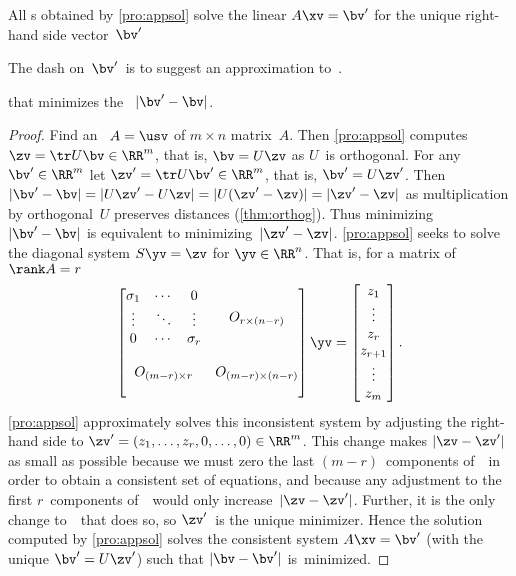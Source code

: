 \begin{theorem} \label{thm:appsol} 
All s obtained by \autoref{pro:appsol} solve the linear  \(A\xv=\bv'\) for the unique  right-hand side vector~\(\bv'\) 
\begin{aside} The dash on~\(\bv'\)\ is to suggest an approximation to~\bv. \end{aside}%
that minimizes the ~\(|\bv'-\bv|\).
\end{theorem}
\begin{proof} 
Find an \svd\ \(A=\usv\) of \(m\times n\) matrix~\(A\).
Then \autoref{pro:appsol} computes \(\zv=\tr U\bv\in\RR^m\), that is, \(\bv=U\zv\) as \(U\)~is orthogonal.
For any \(\bv'\in\RR^m\) let \(\zv'=\tr U\bv'\in\RR^m\), that is, \(\bv'=U\zv'\).
Then \(|\bv'-\bv|=|U\zv'-U\zv|=|U(\zv'-\zv)|=|\zv'-\zv|\) as multiplication by orthogonal~\(U\) preserves distances (\autoref{thm:orthog}).
Thus minimizing~\(|\bv'-\bv|\) is equivalent to minimizing~\(|\zv'-\zv|\).
\autoref{pro:appsol} seeks to solve the diagonal system \(S\yv=\zv\) for \(\yv\in\RR^n\). 
That is, for a matrix of \(\rank A=r\)
\begin{equation*}
\begin{bmatrix} \begin{matrix} \sigma_1&\cdots&0\\
\vdots&\ddots&\vdots\\
0&\cdots&\sigma_r \end{matrix} & 
O_{r\times (n-r)}\\\,\\
O_{(m-r)\times r}&O_{(m-r)\times (n-r)}
\\\,\end{bmatrix}\yv
=\begin{bmatrix} z_1\\\vdots\\z_r\\z_{r+1}\\\vdots\\z_m \end{bmatrix}.
\end{equation*}
\autoref{pro:appsol} approximately solves this inconsistent system by adjusting the right-hand side to \(\zv'=(z_1,\ldots,z_r,0,\ldots,0)\in\RR^m\).
This change makes \(|\zv-\zv'|\) as small as possible because we must zero the last \((m-r)\)~components of~\zv\ in order to obtain a consistent set of equations, and because any adjustment to the first \(r\)~components of~\zv\ would only increase~\(|\zv-\zv'|\).
Further, it is the only change to~\zv\ that does so, so \(\zv'\)~is the unique minimizer.
Hence the solution computed by \autoref{pro:appsol} solves the consistent system \(A\xv=\bv'\) (with the unique \(\bv'=U\zv'\)) such that \(|\bv-\bv'|\) is~minimized.
\end{proof}





